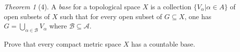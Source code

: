 \documentclass[12pt]{article}
\theoremstyle{remark}
\theoremstyle{named}
\newtheorem*{theorem}{Theorem}
\begin{document}
\begin{theorem}[4]
    A \textit{base} for a topological space \(X\) is a collection \(\{V_{\alpha} | \alpha \in A\}\) of open subsets of \(X\) such that for every open subset of \(G \subseteq X\), one has \(G = \bigcup_{\alpha \in \mathcal B} V_{\alpha}\) where \(\mathcal B \subseteq \mathcal A\).

    Prove that every compact metric space \(X\) has a countable base.
\end{theorem}
\end{document}
